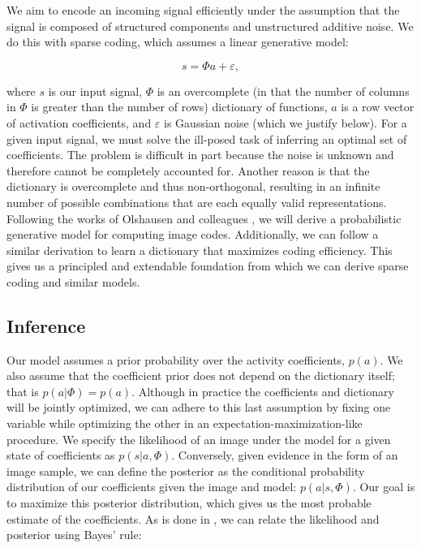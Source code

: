 We aim to encode an incoming signal efficiently under the assumption that the signal is composed of structured components and unstructured additive noise. We do this with sparse coding, which assumes a linear generative model:

\begin{equation} \label{eq:ch2_sparse_generative_model}
    s = \Phi a + \varepsilon,
\end{equation}

\noindent where $s$ is our input signal, $\Phi$ is an overcomplete (in that the number of columns in $\Phi$ is greater than the number of rows) dictionary of functions, $a$ is a row vector of activation coefficients, and $\varepsilon$ is Gaussian noise (which we justify below). For a given input signal, we must solve the ill-posed task of inferring an optimal set of coefficients. The problem is difficult in part because the noise is unknown and therefore cannot be completely accounted for. Another reason is that the dictionary is overcomplete and thus non-orthogonal, resulting in an infinite number of possible combinations that are each equally valid representations. Following the works of Olshausen and colleagues \parencite{olshausen1996learning, olshausen2003principles, karklin1999porbabilistic}, we will derive a probabilistic generative model for computing image codes. Additionally, we can follow a similar derivation to learn a dictionary that maximizes coding efficiency. This gives us a principled and extendable foundation from which we can derive sparse coding and similar models.


\subsection{Inference}
Our model assumes a prior probability over the activity coefficients, $p(a)$. We also assume that the coefficient prior does not depend on the dictionary itself; that is $p(a|\Phi) = p(a)$. Although in practice the coefficients and dictionary will be jointly optimized, we can adhere to this last assumption by fixing one variable while optimizing the other in an expectation-maximization-like procedure. We specify the likelihood of an image under the model for a given state of coefficients as $p(s|a,\Phi)$. Conversely, given evidence in the form of an image sample, we can define the posterior as the conditional probability distribution of our coefficients given the image and model: $p(a|s,\Phi)$. Our goal is to maximize this posterior distribution, which gives us the most probable estimate of the coefficients. As is done in \parencite{karklin1999porbabilistic}, we can relate the likelihood and posterior using Bayes' rule:

